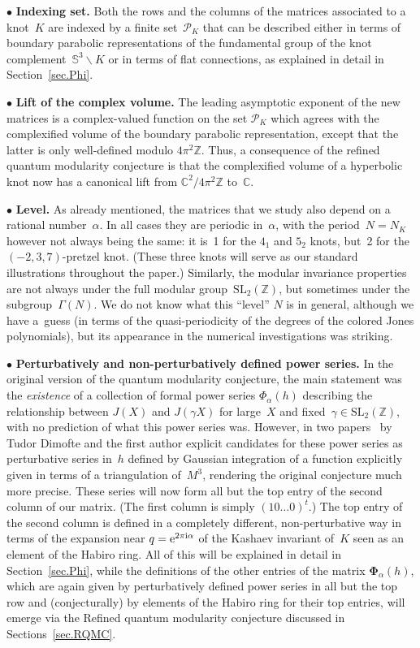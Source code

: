 \documentclass[pdftex]{sigma}
\numberwithin{equation}{section}
\def\BZ{\mathbb Z}
\def\BC{\mathbb C}
\def\calP{\mathcal P}
\def\calP{\mathcal P}
\def\SL{\mathrm{SL}}
\def\a{\alpha}
\def\Z{\mathbb Z}
\def\a{\alpha}
\def\G{\Gamma}
\def\G{\Gamma}
\def\ssm{\smallsetminus}
\def\g{\gamma}
\def\bPhi{\mathbf\Phi}
\begin{document}
$\bullet$ {\bf Indexing set.}
Both the rows and the columns of the matrices
associated to a knot~$K$ are indexed by a finite set~$\calP_K$ that can be described
either in terms of boundary parabolic representations of the fundamental group of the
knot complement~$\mathbb S^3\ssm K$ or in terms of flat connections, as explained in
detail in Section~\ref{sec.Phi}.

$\bullet$ {\bf Lift of the complex volume.}
The leading asymptotic exponent of the new matrices is a complex-valued function on
the set $\calP_K$ which agrees with the complexified volume of the boundary
parabolic representation, except that the latter is only well-defined modulo $4 \pi^2\BZ$.
Thus, a consequence of the refined quantum modularity conjecture is that the
complexified volume of a hyperbolic knot now has a canonical lift from $\BC^2/4\pi^2\BZ$ to~$\BC$.

$\bullet$ {\bf Level.}
As already mentioned, the matrices that we study also
depend on a rational number~$\a$. In all cases they are periodic in~$\a$, with the
period~$N=N_K$ however not always being the same: it is~1 for the $4_1$ and $5_2$ knots,
but~2 for the $(-2,3,7)$-pretzel knot. (These three knots will serve as our standard
illustrations throughout the paper.) Similarly, the modular invariance properties are
not always under the full modular group~$\SL_2(\Z)$, but sometimes under the
subgroup~$\G(N)$. We do not know what this ``level'' $N$ is in general, although we have
a~guess (in terms of the quasi-periodicity of the degrees of the colored
Jones polynomials), but its appearance in the numerical investigations was striking.

$\bullet$ {\bf Perturbatively and non-perturbatively defined power series.}
In the original version of the quantum modularity conjecture, the main statement was the
\emph{existence} of a collection of formal power series $\Phi_\a(h)$ describing the
relationship between $J(X)$ and $J(\g X)$ for large~$X$ and fixed~$\g\in\SL_2(\Z)$,
with no prediction of what this power series was. However, in two papers~\cite{DG,DG2}
by Tudor Dimofte and the first author explicit candidates for these power series as
perturbative series in~$h$ defined by Gaussian integration of a function explicitly
given in terms of a triangulation of~$M^3$, rendering the original conjecture much more
precise. These series will now form all but the top entry of the second column of
our matrix. \big(The first column is simply $(1 0 \dots 0)^t$.\big) The top entry
of the second column is defined in a completely different, non-perturbative way in
terms of the expansion near $q={\rm e}^{2\pi{\rm i}\a}$ of the Kashaev invariant of~$K$ seen as an
element of the Habiro ring. All of this will be explained in detail in
Section~\ref{sec.Phi}, while the definitions of the other entries of the matrix
$\bPhi_\a(h)$, which are again given by perturbatively defined power series in all but
the top row and (conjecturally) by elements of the Habiro ring for their top entries,
will emerge via the Refined quantum modularity conjecture discussed in
Sections~\ref{sec.RQMC}.
\end{document}
